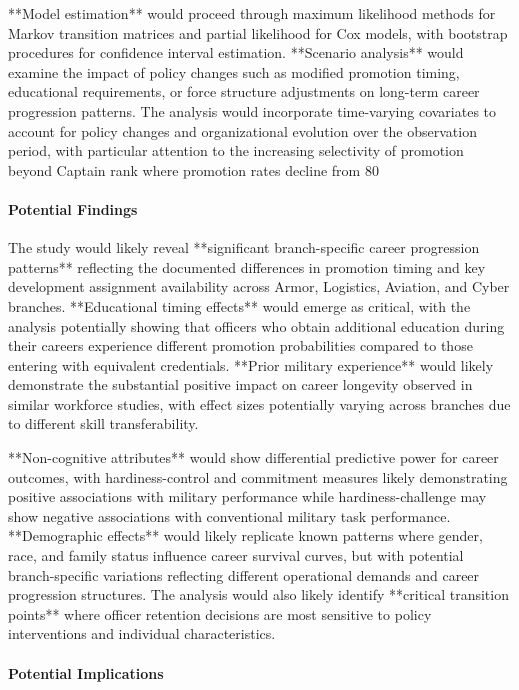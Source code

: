 \documentclass[main.tex]{subfiles}
\begin{document}
**Model estimation** would proceed through maximum likelihood methods for Markov transition matrices and partial likelihood for Cox models, with bootstrap procedures for confidence interval estimation. **Scenario analysis** would examine the impact of policy changes such as modified promotion timing, educational requirements, or force structure adjustments on long-term career progression patterns. The analysis would incorporate time-varying covariates to account for policy changes and organizational evolution over the observation period, with particular attention to the increasing selectivity of promotion beyond Captain rank where promotion rates decline from 80%

\paragraph{Potential Findings}

The study would likely reveal **significant branch-specific career progression patterns** reflecting the documented differences in promotion timing and key development assignment availability across Armor, Logistics, Aviation, and Cyber branches. **Educational timing effects** would emerge as critical, with the analysis potentially showing that officers who obtain additional education during their careers experience different promotion probabilities compared to those entering with equivalent credentials. **Prior military experience** would likely demonstrate the substantial positive impact on career longevity observed in similar workforce studies, with effect sizes potentially varying across branches due to different skill transferability.

**Non-cognitive attributes** would show differential predictive power for career outcomes, with hardiness-control and commitment measures likely demonstrating positive associations with military performance while hardiness-challenge may show negative associations with conventional military task performance. **Demographic effects** would likely replicate known patterns where gender, race, and family status influence career survival curves, but with potential branch-specific variations reflecting different operational demands and career progression structures. The analysis would also likely identify **critical transition points** where officer retention decisions are most sensitive to policy interventions and individual characteristics.

\paragraph{Potential Implications}
\end{document}
